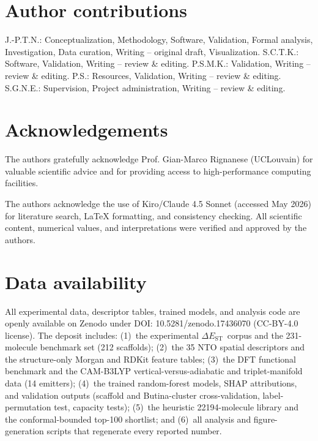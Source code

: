 \documentclass[twoside,onecolumn,9pt]{extarticle}
\newcommand{\deltaest}{$\Delta E_\text{ST}$}
\begin{document}
\section*{Author contributions}
J.-P.T.N.: Conceptualization, Methodology, Software, Validation, Formal analysis, Investigation, Data curation, Writing -- original draft, Visualization.
S.C.T.K.: Software, Validation, Writing -- review \& editing.
P.S.M.K.: Validation, Writing -- review \& editing.
P.S.: Resources, Validation, Writing -- review \& editing.
S.G.N.E.: Supervision, Project administration, Writing -- review \& editing.

\section*{Acknowledgements}
The authors gratefully acknowledge Prof. Gian-Marco Rignanese (UCLouvain) for valuable scientific advice and
for providing access to high-performance computing facilities.

The authors acknowledge the use of Kiro/Claude 4.5 Sonnet (accessed May 2026) for literature search, LaTeX formatting, and consistency checking. All 
scientific content, numerical values, and interpretations were verified and approved by the authors.

\section*{Data availability}
All experimental data, descriptor tables, trained models, and analysis code are
openly available on Zenodo under DOI: 10.5281/zenodo.17436070 (CC-BY-4.0 license).
The deposit includes: (1)~the experimental \deltaest\ corpus and the
\num{231}-molecule benchmark set (\num{212} scaffolds); (2)~the \num{35} NTO spatial
descriptors and the structure-only Morgan and RDKit feature tables; (3)~the DFT
functional benchmark and the CAM-B3LYP vertical-versus-adiabatic and triplet-manifold
data (\num{14} emitters); (4)~the trained random-forest models, SHAP attributions, and
validation outputs (scaffold and Butina-cluster cross-validation, label-permutation
test, capacity tests); (5)~the heuristic \num{22194}-molecule library and the
conformal-bounded top-\num{100} shortlist; and (6)~all analysis and figure-generation
scripts that regenerate every reported number.



\end{document}
